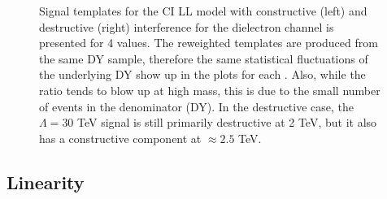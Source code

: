 {\begin{figure}[tb]
\begin{center}
\caption{Signal templates for the CI LL model with constructive (left) and destructive (right) interference for the  dielectron channel is presented for 4 \lam values. The reweighted templates are produced from the same DY sample, therefore the same statistical fluctuations of the underlying DY show up in the plots for each \lam. Also, while the ratio tends to blow up at high mass, this is due to the small number of events in the denominator (DY). In the destructive case, the $\Lambda=30$ TeV signal is still primarily destructive at 2 TeV, but it also has a constructive component at $\approx2.5$ TeV.}
\label{fig:ciSignalRatiosToNominal}
\end{center}
\end{figure}
\clearpage
}

\subsection{Linearity}\label{sec:ciLinearity}
